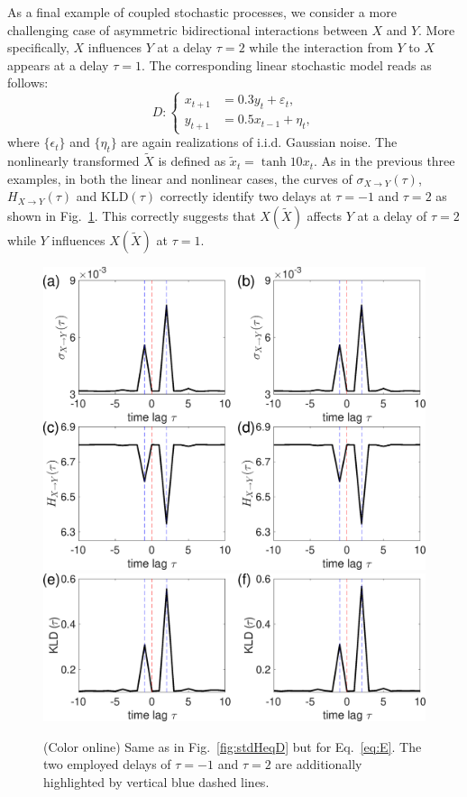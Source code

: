 \documentclass[12pt,aip,cha,reprint,nofootinbib]{revtex4-1}
\begin{document}
As a final example of coupled stochastic processes, we consider a more challenging case of asymmetric bidirectional interactions between $X$ and $Y$. More specifically, $X$ influences $Y$ at a delay $\tau = 2$ while the interaction from $Y$ to $X$ appears at a delay $\tau = 1$. The corresponding linear stochastic model reads as follows: 
\begin{equation} \label{eq:E}
D: \left \{ \begin{aligned}
x_{t+1} &= 0.3 y_{t} + \varepsilon_t, \\
y_{t+1} &= 0.5 x_{t-1} + \eta_t, 
\end{aligned}
\right.
\end{equation}
where $\{ \epsilon_t \}$ and $\{ \eta_t \}$ are again realizations of i.i.d. Gaussian noise. The nonlinearly transformed $\tilde{X}$ is defined as $\tilde{x}_{t} = \tanh{10 x_t}$. As in the previous three examples, in both the linear and nonlinear cases, the curves of $\sigma_{X \to Y}(\tau)$, $H_{X\to Y}(\tau)$ and $\text{KLD}(\tau)$ correctly identify two delays at $\tau = -1$ and $\tau = 2$ as shown in Fig.~\ref{fig:stdHeqE}. This correctly suggests that $X (\tilde{X})$ affects $Y$ at a delay of $\tau = 2$ while $Y$ influences $X (\tilde{X})$ at $\tau = 1$. 

\begin{figure}
	\centering
	\includegraphics[width=\columnwidth]{E_E.eps}
	\includegraphics[width=\columnwidth]{KL_E.eps}
\caption{(Color online) Same as in Fig.~\ref{fig:stdHeqD} but for Eq.~\eqref{eq:E}. The two employed delays of $\tau = -1$ and $\tau = 2$ are additionally highlighted by vertical blue dashed lines. \label{fig:stdHeqE}}
\end{figure}
\end{document}
